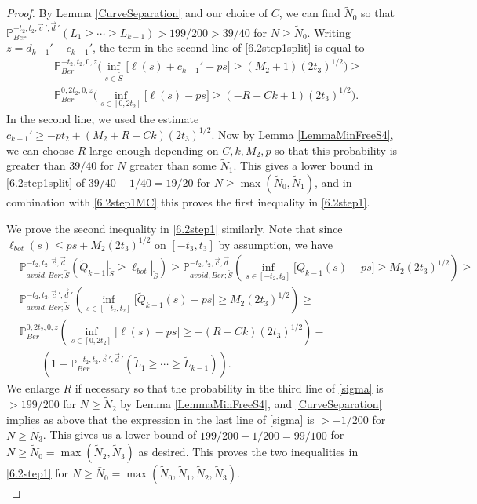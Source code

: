 \begin{proof}
	By Lemma \ref{CurveSeparation} and our choice of $C$, we can find $\tilde{N}_0$ so that $\mathbb{P}^{-t_2, t_2, \vec{c}\,', \vec{d}\,'}_{Ber}(L_1 \geq \cdots \geq L_{k-1})>199/200 > 39/40$ for $N\geq\tilde{N}_0$. Writing $z = d_{k-1}' - c_{k-1}'$, the term in the second line of \eqref{6.2step1split} is equal to
	\begin{align*}
	&\mathbb{P}^{-t_2, t_2, 0, z}_{Ber}\Big(\inf_{s\in \tilde S}\big[\ell(s) + c_{k-1}' - ps\big]  \geq (M_2 + 1)(2t_3)^{1/2}\Big) \geq \\
	& \mathbb{P}^{0, 2t_2, 0, z}_{Ber}\Big(\inf_{s\in [0,2t_2]}\big[\ell(s) - ps\big] \geq (-R+Ck+1)(2t_3)^{1/2}\Big).
	\end{align*}
	In the second line, we used the estimate $c_{k-1}' \geq -pt_2 + (M_2+R-Ck)(2t_3)^{1/2}$. Now by Lemma \ref{LemmaMinFreeS4}, we can choose $R$ large enough depending on $C,k,M_2,p$ so that this probability is greater than $39/40$ for $N$ greater than some $\tilde{N}_1$. This gives a lower bound in \eqref{6.2step1split} of $39/40-1/40 = 19/20$ for $N\geq\max(\tilde{N}_0,\tilde{N}_1)$, and in combination with \eqref{6.2step1MC} this proves the first inequality in \eqref{6.2step1}.
	
	We prove the second inequality in \eqref{6.2step1} similarly. Note that since $\ell_{bot}(s) \leq ps + M_2(2t_3)^{1/2}$ on $[-t_3,t_3]$ by assumption, we have
	\begin{equation} \label{sigma}
	\begin{split}
	&\mathbb{P}^{-t_2,t_2,\vec{c},\vec{d}}_{avoid,Ber;\tilde S}\left(\tilde Q_{k-1}|_{\tilde S} \geq \ell_{bot}|_{\tilde S}\right) \geq \mathbb{P}^{-t_2, t_2, \vec{c},\vec{d}}_{avoid, Ber; \tilde S}\left(\inf_{s\in[-t_2, t_2]} \big[Q_{k-1}(s) - ps\big] \geq M_2(2t_3)^{1/2}\right) \geq\\
	&\mathbb{P}^{-t_2, t_2, \vec{c}\,',\vec{d}\,'}_{avoid, Ber;\tilde S}\left(\inf_{s\in[-t_2, t_2]} \big[\tilde Q_{k-1}(s) - ps\big] \geq M_2(2t_3)^{1/2}\right) \geq\\
	&\mathbb{P}^{0, 2t_2, 0, z}_{Ber}\left(\inf_{s\in[0, 2t_2]} \big[\ell(s) - ps\big] \geq -(R-Ck)(2t_3)^{1/2}\right) - \\
	&\qquad \left(1 - \mathbb{P}^{-t_2,t_2,\vec{c}\,',\vec{d}\,'}_{Ber}(\tilde L_1\geq \cdots \geq \tilde L_{k-1})\right).
	\end{split}
	\end{equation}
	We enlarge $R$ if necessary so that the probability in the third line of \eqref{sigma} is $>199/200$ for $N\geq\tilde{N}_2$ by Lemma \ref{LemmaMinFreeS4}, and \ref{CurveSeparation} implies as above that the expression in the last line of \eqref{sigma} is $>-1/200$ for $N\geq\tilde{N}_3$. This gives us a lower bound of $199/200 - 1/200 = 99/100$ for $N\geq\tilde{N}_0 = \max(\tilde{N}_2,\tilde{N}_3)$ as desired. This proves the two inequalities in \eqref{6.2step1} for $N\geq\bar{N}_0 = \max(\tilde{N}_0,\tilde{N}_1,\tilde{N}_2,\tilde{N}_3)$.\\
	

\end{proof}
